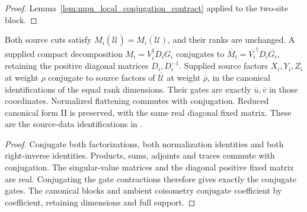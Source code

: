 \begin{proof}
    \leanok
    Lemma~\ref{lem:mpu_local_conjugation_contract} applied to the two-site
    block.
\end{proof}

\begin{lemma}
    \label{lem:mpu_source_conjugation_transport}
    \leanok
    Both source cuts satisfy
    $M_i(\overline{\mathcal U})=\overline{M_i(\mathcal U)}$, and their ranks
    are unchanged. A supplied compact decomposition
    $M_i=V_i^\dagger D_i G_i$ conjugates to
    $\overline{M_i}=\overline{V_i}^\dagger D_i\overline{G_i}$, retaining
    the positive diagonal matrices $D_i,D_i^{-1}$.
    Supplied source factors $X_i,Y_i,Z_i$ at weight $\rho$ conjugate to
    source factors of $\overline{\mathcal U}$ at weight $\overline\rho$,
    in the canonical identifications of the equal rank dimensions. Their
    gates are exactly $\overline u,\overline v$ in those coordinates.
    Normalized flattening commutes with conjugation. Reduced canonical form II
    is preserved, with the same real diagonal fixed matrix.
    These are the source-data identifications in
    \cite[Proposition~V.1, lines~1030--1033]{Cirac2017MPU}.
\end{lemma}

\begin{proof}
    \leanok
    Conjugate both factorizations, both normalization identities and both
    right-inverse identities. Products, sums, adjoints and traces commute
    with conjugation. The singular-value matrices and the diagonal positive
    fixed matrix are real. Conjugating the gate contractions therefore gives
    exactly the conjugate gates. The canonical blocks and ambient coisometry
    conjugate coefficient by coefficient, retaining dimensions and full support.
\end{proof}

